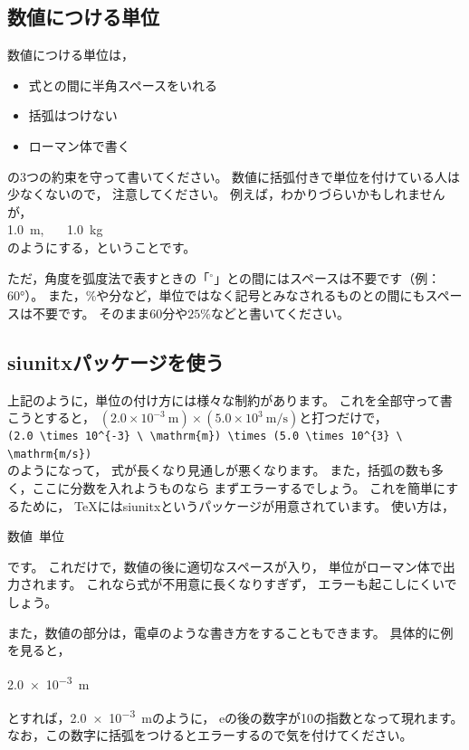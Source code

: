 \subsection{数値につける単位}
数値につける単位は，
\begin{itemize}
\item 式との間に半角スペースをいれる
\item 括弧はつけない
\item ローマン体で書く
\end{itemize}
の3つの約束を守って書いてください。
数値に括弧付きで単位を付けている人は少なくないので，
注意してください。
例えば，わかりづらいかもしれませんが，\\
\hspace{5zw} \SI{1.0}{m}, \ \ \ \SI{1.0}{kg} \\
のようにする，ということです。

ただ，角度を弧度法で表すときの「${}^{\circ}$」との間にはスペースは不要です（例：\ang{60}）。
また，{\%}や分など，単位ではなく記号とみなされるものとの間にもスペースは不要です。
そのまま$60\text{分}$や$25{\%}$などと書いてください。


\subsection{siunitxパッケージを使う}
上記のように，単位の付け方には様々な制約があります。
これを全部守って書こうとすると，
$(2.0 \times 10^{-3} \ \mathrm{m}) \times (5.0 \times 10^{3} \ \mathrm{m/s})$と打つだけで，\\
\hspace{3zw} \verb*|(2.0 \times 10^{-3} \ \mathrm{m}) \times (5.0 \times 10^{3} \ \mathrm{m/s})|　\\
のようになって，
式が長くなり見通しが悪くなります。
また，括弧の数も多く，ここに分数を入れようものなら
まずエラーするでしょう。
これを簡単にするために，
{\TeX}にはsiunitxというパッケージが用意されています。
使い方は，
\begin{ITeX}
\SI{数値}{単位}
\end{ITeX}
です。
これだけで，数値の後に適切なスペースが入り，
単位がローマン体で出力されます。
これなら式が不用意に長くなりすぎず，
エラーも起こしにくいでしょう。

また，数値の部分は，電卓のような書き方をすることもできます。
具体的に例を見ると，
\begin{ITeX}
\SI{2.0e-3}{m}
\end{ITeX}
とすれば，\SI{2.0e-3}{m}のように，
eの後の数字が10の指数となって現れます。
なお，この数字に括弧をつけるとエラーするので気を付けてください。

